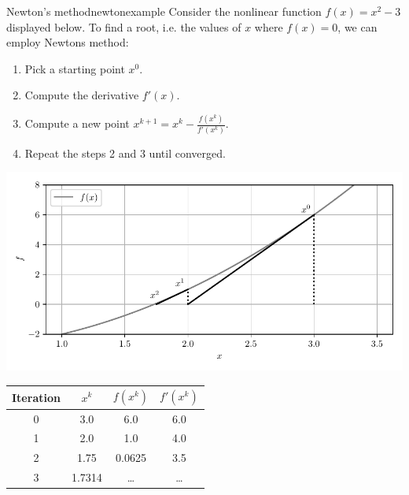 \begin{example}{Newton's method}{newtonexample}
    Consider the nonlinear function $f(x) = x^2 - 3$ displayed below. To find a root, i.e. the values of $x$ where $f(x)=0$, we can employ Newtons method: 
    \begin{enumerate}
        \item Pick a starting point $x^0$.
        \item Compute the derivative $f'(x)$.
        \item Compute a new point $x^{k+1} = x^k - \frac{f(x^k)}{f'(x^k)}$.
        \item Repeat the steps 2 and 3 until converged.
    \end{enumerate}
    
    \includegraphics[width=\textwidth]{figures/netwon_iteration.pdf}
    \begin{center}    
        \begin{tabular}{cccc}
    
             Iteration  & $x^k$     & $f(x^k)$  & $f'(x^k)$\\
             \hline
             0          & 3.0       & 6.0       & 6.0\\
             1          & 2.0       & 1.0       & 4.0\\
             2          & 1.75      & 0.0625    & 3.5\\
             3          & 1.7314    & \dots     & \dots\\
        \end{tabular}
    \end{center}
\end{example}



